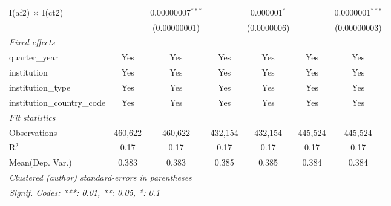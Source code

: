 \begin{tabular}{lcccccc}
   I(af\^2) $\times$ I(ct\^2)         &               & 0.00000007$^{***}$ &               & 0.000001$^{*}$ &               & 0.0000001$^{***}$\\   
                                      &               & (0.00000001)       &               & (0.0000006)    &               & (0.00000003)\\   
   \midrule
   \emph{Fixed-effects}\\
   quarter\_year                      & Yes           & Yes                & Yes           & Yes            & Yes           & Yes\\  
   institution                        & Yes           & Yes                & Yes           & Yes            & Yes           & Yes\\  
   institution\_type                  & Yes           & Yes                & Yes           & Yes            & Yes           & Yes\\  
   institution\_country\_code         & Yes           & Yes                & Yes           & Yes            & Yes           & Yes\\  
   \midrule
   \emph{Fit statistics}\\
   Observations                       & 460,622       & 460,622            & 432,154       & 432,154        & 445,524       & 445,524\\  
   R$^2$                              & 0.17          & 0.17               & 0.17          & 0.17           & 0.17          & 0.17\\  
Mean(Dep. Var.) & 0.383 & 0.383 & 0.385 & 0.385 & 0.384 & 0.384 \\
   \midrule \midrule
   \multicolumn{7}{l}{\emph{Clustered (author) standard-errors in parentheses}}\\
   \multicolumn{7}{l}{\emph{Signif. Codes: ***: 0.01, **: 0.05, *: 0.1}}\\
\end{tabular}
\par\endgroup
